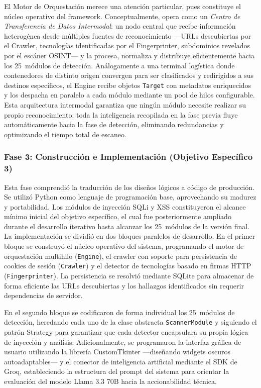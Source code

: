 \documentclass[12pt, a4paper]{article}
\begin{document}
El Motor de Orquestación merece una atención particular, pues constituye el
núcleo operativo del framework. Conceptualmente, opera como un
\textit{Centro de Transferencia de Datos Intermodal}: un nodo central que
recibe información heterogénea desde múltiples fuentes de reconocimiento
---URLs descubiertas por el Crawler, tecnologías identificadas por el
Fingerprinter, subdominios revelados por el escáner OSINT--- y la procesa,
normaliza y distribuye eficientemente hacia los 25~módulos de detección.
Análogamente a una terminal logística donde contenedores de distinto origen
convergen para ser clasificados y redirigidos a sus destinos específicos, el
Engine recibe objetos \texttt{Target} con metadatos enriquecidos y los
despacha en paralelo a cada módulo mediante un pool de hilos configurable.
Esta arquitectura intermodal garantiza que ningún módulo necesite realizar
su propio reconocimiento: toda la inteligencia recopilada en la fase previa
fluye automáticamente hacia la fase de detección, eliminando redundancias y
optimizando el tiempo total de escaneo.

\subsubsection{Fase 3: Construcción e Implementación (Objetivo Específico 3)}

Esta fase comprendió la traducción de los diseños lógicos a código de
producción. Se utilizó Python como lenguaje de programación base, aprovechando su
madurez y portabilidad. Los módulos de inyección SQLi y XSS constituyeron el
alcance mínimo inicial del objetivo específico, el cual fue posteriormente ampliado
durante el desarrollo iterativo hasta alcanzar los 25~módulos de la versión final.
La implementación se dividió en dos bloques paralelos de
desarrollo. En el primer bloque se construyó el núcleo operativo del sistema,
programando el motor de orquestación multihilo (\texttt{Engine}), el crawler con
soporte para persistencia de cookies de sesión (\texttt{Crawler}) y el detector de
tecnologías basado en firmas HTTP (\texttt{Fingerprinter}). La persistencia se
resolvió mediante SQLite para almacenar de forma eficiente las URLs descubiertas
y los hallazgos identificados sin requerir dependencias de servidor.

En el segundo bloque se codificaron de forma individual los 25~módulos de
detección, heredando cada uno de la clase abstracta \texttt{ScannerModule} y
siguiendo el patrón Strategy para garantizar que cada detector encapsulara su
propia lógica de inyección y análisis. Adicionalmente, se programaron la interfaz
gráfica de usuario utilizando la librería CustomTkinter ---diseñando widgets
oscuros autoadaptables--- y el conector de inteligencia artificial mediante el SDK de
Groq, estableciendo la estructura del prompt del sistema para orientar la
evaluación del modelo Llama 3.3 70B hacia la accionabilidad técnica.
\end{document}
